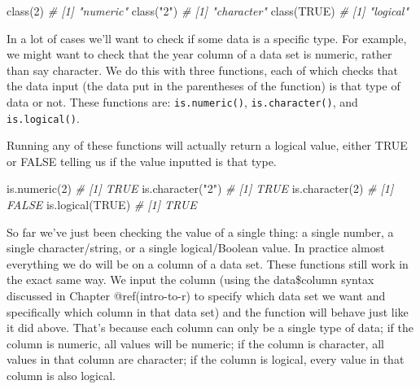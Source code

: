 \documentclass[
  a4paper,
]{krantz}
\makeatletter
\newenvironment{Shaded}{\begin{snugshade}}{\end{snugshade}}
\newcommand{\CommentTok}[1]{\textcolor[rgb]{0.56,0.35,0.01}{\textit{#1}}}
\newcommand{\ConstantTok}[1]{\textcolor[rgb]{0.00,0.00,0.00}{#1}}
\newcommand{\DecValTok}[1]{\textcolor[rgb]{0.00,0.00,0.81}{#1}}
\newcommand{\FunctionTok}[1]{\textcolor[rgb]{0.00,0.00,0.00}{#1}}
\newcommand{\NormalTok}[1]{#1}
\newcommand{\StringTok}[1]{\textcolor[rgb]{0.31,0.60,0.02}{#1}}
\newenvironment{kframe}{%
\medskip{}
\setlength{\fboxsep}{.8em}
 \def\at@end@of@kframe{}%
 \ifinner\ifhmode%
  \def\at@end@of@kframe{\end{minipage}}%
  \begin{minipage}{\columnwidth}%
 \fi\fi%
 \def\FrameCommand##1{\hskip\@totalleftmargin \hskip-\fboxsep
 \colorbox{shadecolor}{##1}\hskip-\fboxsep
     \hskip-\linewidth \hskip-\@totalleftmargin \hskip\columnwidth}%
 \MakeFramed {\advance\hsize-\width
   \@totalleftmargin\z@ \linewidth\hsize
   \@setminipage}}%
 {\par\unskip\endMakeFramed%
 \at@end@of@kframe}
\renewenvironment{Shaded}{\begin{kframe}}{\end{kframe}}
\makeatother
\begin{document}
\begin{Shaded}
\begin{Highlighting}[]
\FunctionTok{class}\NormalTok{(}\DecValTok{2}\NormalTok{)}
\CommentTok{\# [1] "numeric"}
\FunctionTok{class}\NormalTok{(}\StringTok{"2"}\NormalTok{)}
\CommentTok{\# [1] "character"}
\FunctionTok{class}\NormalTok{(}\ConstantTok{TRUE}\NormalTok{)}
\CommentTok{\# [1] "logical"}
\end{Highlighting}
\end{Shaded}

In a lot of cases we'll want to check if some data is a
specific type. For example, we might want to check that the
year column of a data set is numeric, rather than say
character. We do this with three functions, each of which
checks that the data input (the data put in the parentheses
of the function) is that type of data or not. These
functions are: \texttt{is.numeric()},
\texttt{is.character()}, and \texttt{is.logical()}.

Running any of these functions will actually return a
logical value, either TRUE or FALSE telling us if the value
inputted is that type.

\begin{Shaded}
\begin{Highlighting}[]
\FunctionTok{is.numeric}\NormalTok{(}\DecValTok{2}\NormalTok{)}
\CommentTok{\# [1] TRUE}
\FunctionTok{is.character}\NormalTok{(}\StringTok{"2"}\NormalTok{)}
\CommentTok{\# [1] TRUE}
\FunctionTok{is.character}\NormalTok{(}\DecValTok{2}\NormalTok{)}
\CommentTok{\# [1] FALSE}
\FunctionTok{is.logical}\NormalTok{(}\ConstantTok{TRUE}\NormalTok{)}
\CommentTok{\# [1] TRUE}
\end{Highlighting}
\end{Shaded}

So far we've just been checking the value of a single thing:
a single number, a single character/string, or a single
logical/Boolean value. In practice almost everything we do
will be on a column of a data set. These functions still
work in the exact same way. We input the column (using the
data\$column syntax discussed in Chapter @ref(intro-to-r) to
specify which data set we want and specifically which column
in that data set) and the function will behave just like it
did above. That's because each column can only be a single
type of data; if the column is numeric, all values will be
numeric; if the column is character, all values in that
column are character; if the column is logical, every value
in that column is also logical.
\end{document}
